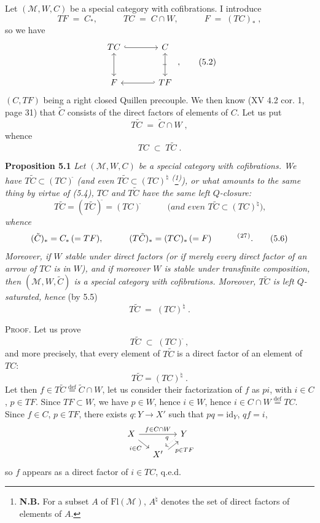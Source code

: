 \documentclass[11pt]{article}
\newcommand{\printedpage}[1]{\marginpar{\footnotesize p.~#1}}
\newcommand{\msp}[1]{\marginpar{\footnotesize [#1]}}
\newcommand{\defeq}{\overset{\text{def}}{=}}
\newcommand{\fnm}[1]{\textsuperscript{(}\footnotemark[#1]\textsuperscript{)}}
\newcommand{\cl}{^{\tilde{}}}%
\begin{document}
Let $(\mathcal{M}, W, C)$ be a special category with cofibrations. I introduce
\[
TF \;=\; C_{*}, \qquad\quad TC \;=\; C \cap W, \qquad\quad F \;=\; (TC)_{*} \; ,
\tag*{(5.1)}
\]
so we have
\[
\begin{tikzcd}[row sep=large, column sep=large]
TC \arrow[r, hook] \arrow[d, leftrightarrow] & C \arrow[d, leftrightarrow, "\shortmid"{marking, sloped}] \\
F & TF \arrow[l, hook']
\end{tikzcd} \; ,
\tag*{(5.2)}
\]
$(C, TF)$ being a right closed Quillen precouple. We then know (XV 4.2 cor. 1, page 31) that $\tilde{C}$ consists of the direct factors of elements of $C$. Let us put
\[
T\tilde{C} \;=\; \tilde{C} \cap W \; ,
\tag*{(5.3)}
\]
whence
\[
TC \;\subset\; T\tilde{C} \; .
\tag*{(5.4)}
\]

\textbf{Proposition 5.1} \textit{Let $(\mathcal{M}, W, C)$ be a special category with cofibrations. We have $T\tilde{C} \subset (TC)\cl$ (and even $T\tilde{C} \subset (TC)^{\natural}$ \textsuperscript{(}\footnote[26]{\textbf{N.B.} For a subset $A$ of $\mathrm{Fl}(\mathcal{M})$, $A^{\natural}$ denotes the set of direct factors of elements of $A$.}\textsuperscript{)}), or what amounts to the same thing by virtue of (5.4), $TC$ and $T\tilde{C}$ have the same left $Q$-closure:}
\[
T\tilde{C} = (T\tilde{C})\cl = (TC)\cl \qquad\quad \textit{(and even } T\tilde{C} \subset (TC)^{\natural}\textit{),}
\tag*{(5.5)}
\]
\printedpage{42}
\textit{whence}
\[
(\tilde{C})_{*} = C_{*} \, (= TF), \qquad\quad (T\tilde{C})_{*} = (TC)_{*} \, (= F) \qquad\quad \text{\fnm{27}}.
\tag*{(5.6)}
\]
\textit{Moreover, if $W$ stable under direct factors (or if merely every direct factor of an arrow of $TC$ is in $W$), and if moreover $W$ is stable under transfinite composition, then $(\mathcal{M}, W, \tilde{C})$ is a special category with cofibrations. Moreover, $T\tilde{C}$ is left $Q$-saturated, hence} (by 5.5)
\[
T\tilde{C} \;=\; (TC)^{\natural} \; .
\tag*{(5.7)}
\]

\msp{page 85}

\textsc{Proof}. Let us prove
\[
T\tilde{C} \;\subset\; (TC)\cl \, ,
\]
and more precisely, that every element of $T\tilde{C}$ is a direct factor of an element of $TC$:
\[
T\tilde{C} = (TC)^{\natural} \; .
\]
Let then $f \in T\tilde{C} \defeq \tilde{C}\cap W$, let us consider their factorization of $f$ as $pi$, with $i \in C$, $p \in TF$. Since $TF \subset W$, we have $p \in W$, hence $i \in W$, hence $i \in C \cap W \defeq TC$. Since $f \in C$, $p \in TF$, there exists $q : Y \longrightarrow X'$ such that $pq = \mathrm{id}_Y$, $qf = i$,
\[
\begin{tikzcd}[column sep=small, row sep=small]
X \arrow[rr, "f\in C\cap W"] \arrow[dr, "i\in C"'] & & Y \arrow[dl, dotted, shift right, "q"'] \\
& X' \arrow[ur, shift right, "p\in TF"'] &
\end{tikzcd}
\]
so $f$ appears as a direct factor of $i \in TC$, q.e.d.
\end{document}
